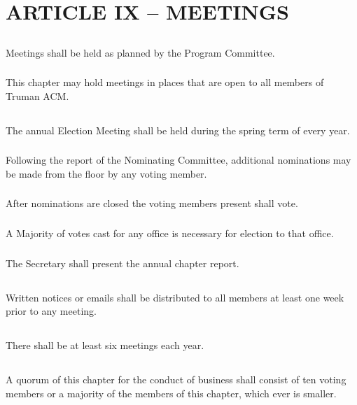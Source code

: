 \documentclass[12pt]{article}
\begin{document}
\section{ARTICLE IX – MEETINGS}
\subsection{}	Meetings shall be held as planned by the Program Committee.
\subsubsection{}	This chapter may hold meetings in places that are open to all members of Truman ACM.
\subsection{}	The annual Election Meeting shall be held during the spring term of every year.
\subsubsection{}	Following the report of the Nominating Committee, additional nominations may be made from the floor by any voting member.
\subsubsection{}	After nominations are closed the voting members present shall vote.
\subsubsection{}	A Majority of votes cast for any office is necessary for election to that office.
\subsubsection{}	The Secretary shall present the annual chapter report.
\subsection{}	Written notices or emails shall be distributed to all members at least one week prior to any meeting.
\subsection{}	There shall be at least six meetings each year.
\subsection{}	A quorum of this chapter for the conduct of business shall consist of ten voting members or a majority of the members of this chapter, which ever is smaller.
\end{document}
